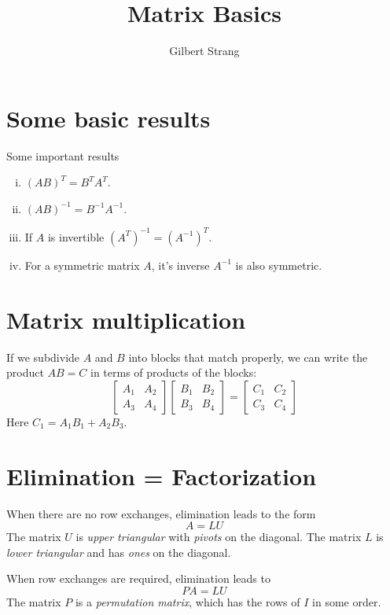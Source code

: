 \documentclass{tufte-handout}
\author{Gilbert Strang}
\title{Matrix Basics}
\begin{document}
\maketitle

\section{Some basic results}
Some important results
\begin{enumerate}[(i)]
\item $(AB)^T = B^TA^T$.
\item $(AB)^{-1} = B^{-1}A^{-1}$.
\item If $A$ is invertible $(A^T)^{-1} = (A^{-1})^{T}$.
\item For a symmetric matrix $A$, it's inverse $A^{-1}$ is also symmetric.
\end{enumerate}

\section{Matrix multiplication}
If we subdivide $A$ and $B$ into blocks that match properly, we can write
the product $AB = C$ in terms of products of the blocks:
\begin{equation*}
  \begin{bmatrix}
    A_{1} & A_{2} \\
    A_{3} & A_{4}
  \end{bmatrix}
  \begin{bmatrix}
    B_{1} & B_{2} \\
    B_{3} & B_{4}
  \end{bmatrix}
  =
  \begin{bmatrix}
    C_1 & C_2 \\
    C_3 & C_4
  \end{bmatrix}
\end{equation*}
Here $C_1 = A_1B_1 + A_2B_3$.

\section{Elimination = Factorization}
When there are no row exchanges, elimination leads to the form
\begin{equation*}
  A = LU
\end{equation*}
The matrix $U$ is \emph{upper triangular} with \emph{pivots} on the
diagonal. The matrix $L$ is \emph{lower triangular} and has \emph{ones}
on the diagonal.

\newthought{}When row exchanges are required, elimination leads to
\begin{equation*}
  PA = LU
\end{equation*}
The matrix $P$ is a \emph{permutation matrix}, which has the rows of $I$
in some order.
\end{document}
